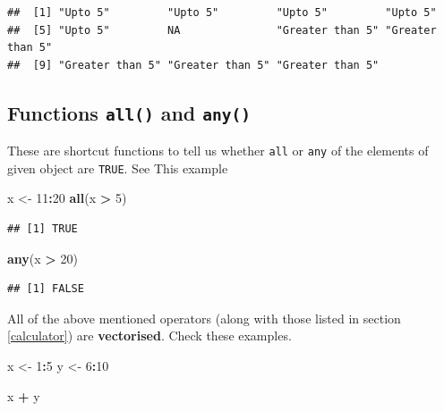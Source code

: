 \documentclass[
]{book}
\newenvironment{Shaded}{\begin{snugshade}}{\end{snugshade}}
\newcommand{\DecValTok}[1]{\textcolor[rgb]{0.00,0.00,0.81}{#1}}
\newcommand{\FunctionTok}[1]{\textcolor[rgb]{0.13,0.29,0.53}{\textbf{#1}}}
\newcommand{\NormalTok}[1]{#1}
\newcommand{\OtherTok}[1]{\textcolor[rgb]{0.56,0.35,0.01}{#1}}
\newcommand{\SpecialCharTok}[1]{\textcolor[rgb]{0.81,0.36,0.00}{\textbf{#1}}}
\begin{document}
\begin{verbatim}
##  [1] "Upto 5"         "Upto 5"         "Upto 5"         "Upto 5"        
##  [5] "Upto 5"         NA               "Greater than 5" "Greater than 5"
##  [9] "Greater than 5" "Greater than 5" "Greater than 5"
\end{verbatim}

\hypertarget{functions-all-and-any}{%
\subsection*{\texorpdfstring{Functions \texttt{all()} and \texttt{any()}}{Functions all() and any()}}\label{functions-all-and-any}}

These are shortcut functions to tell us whether \texttt{all} or \texttt{any} of the elements of given object are \texttt{TRUE}. See This example

\begin{Shaded}
\begin{Highlighting}[]
\NormalTok{x }\OtherTok{\textless{}{-}} \DecValTok{11}\SpecialCharTok{:}\DecValTok{20}
\FunctionTok{all}\NormalTok{(x }\SpecialCharTok{\textgreater{}} \DecValTok{5}\NormalTok{)}
\end{Highlighting}
\end{Shaded}

\begin{verbatim}
## [1] TRUE
\end{verbatim}

\begin{Shaded}
\begin{Highlighting}[]
\FunctionTok{any}\NormalTok{(x }\SpecialCharTok{\textgreater{}} \DecValTok{20}\NormalTok{)}
\end{Highlighting}
\end{Shaded}

\begin{verbatim}
## [1] FALSE
\end{verbatim}

All of the above mentioned operators (along with those listed in section \ref{calculator}) are \textbf{vectorised}. Check these examples.

\begin{Shaded}
\begin{Highlighting}[]
\NormalTok{x }\OtherTok{\textless{}{-}} \DecValTok{1}\SpecialCharTok{:}\DecValTok{5}
\NormalTok{y }\OtherTok{\textless{}{-}} \DecValTok{6}\SpecialCharTok{:}\DecValTok{10}

\NormalTok{x }\SpecialCharTok{+}\NormalTok{ y}
\end{Highlighting}
\end{Shaded}
\end{document}
